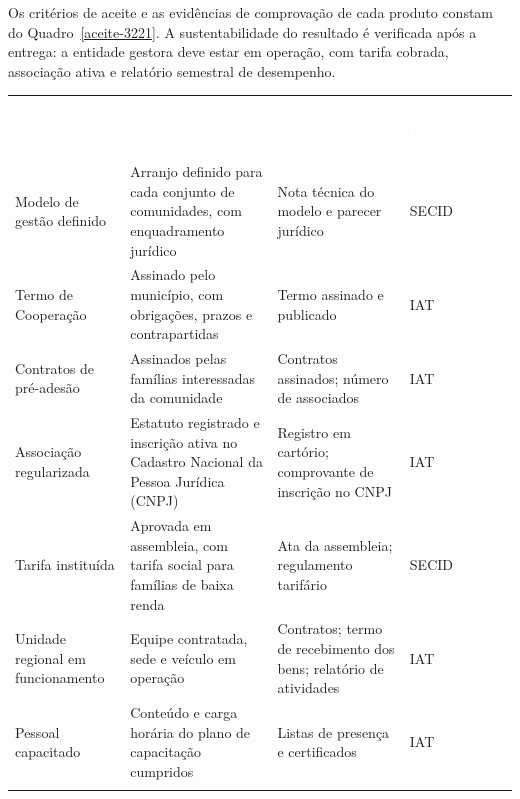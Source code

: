 Os critérios de aceite e as evidências de comprovação de cada produto constam do Quadro~\ref{aceite-3221}. A sustentabilidade do resultado é verificada após a entrega: a entidade gestora deve estar em operação, com tarifa cobrada, associação ativa e relatório semestral de desempenho.

\begin{quadro}[H]
  \caption{Critérios de aceite e evidências da implantação dos modelos de gestão}\label{aceite-3221}
  \footnotesize\renewcommand{\arraystretch}{1.25}\setlength{\tabcolsep}{5pt}
  \begin{tabular}{>{\raggedright\arraybackslash}p{}>{\raggedright\arraybackslash}p{}>{\raggedright\arraybackslash}p{}>{\raggedright\arraybackslash}p{}}
    \rowcolor{azulEscuro}\textcolor{white}{\textbf{Produto}} & \textcolor{white}{\textbf{Critério de aceite}} & \textcolor{white}{\textbf{Evidência de comprovação}} & \textcolor{white}{\textbf{Responsável pela validação}} \\
    Modelo de gestão definido & Arranjo definido para cada conjunto de comunidades, com enquadramento jurídico & Nota técnica do modelo e parecer jurídico & SECID \\ \arrayrulecolor{cinza20}\hline
    \rowcolor{cinza5}Termo de Cooperação & Assinado pelo município, com obrigações, prazos e contrapartidas & Termo assinado e publicado & IAT \\ \arrayrulecolor{cinza20}\hline
    Contratos de pré-adesão & Assinados pelas famílias interessadas da comunidade & Contratos assinados; número de associados & IAT \\ \arrayrulecolor{cinza20}\hline
    \rowcolor{cinza5}Associação regularizada & Estatuto registrado e inscrição ativa no Cadastro Nacional da Pessoa Jurídica (CNPJ) & Registro em cartório; comprovante de inscrição no CNPJ & IAT \\ \arrayrulecolor{cinza20}\hline
    Tarifa instituída & Aprovada em assembleia, com tarifa social para famílias de baixa renda & Ata da assembleia; regulamento tarifário & SECID \\ \arrayrulecolor{cinza20}\hline
    \rowcolor{cinza5}Unidade regional em funcionamento & Equipe contratada, sede e veículo em operação & Contratos; termo de recebimento dos bens; relatório de atividades & IAT \\ \arrayrulecolor{cinza20}\hline
    Pessoal capacitado & Conteúdo e carga horária do plano de capacitação cumpridos & Listas de presença e certificados & IAT \\ \arrayrulecolor{cinza20}\hline

\end{tabular}
\end{quadro}
